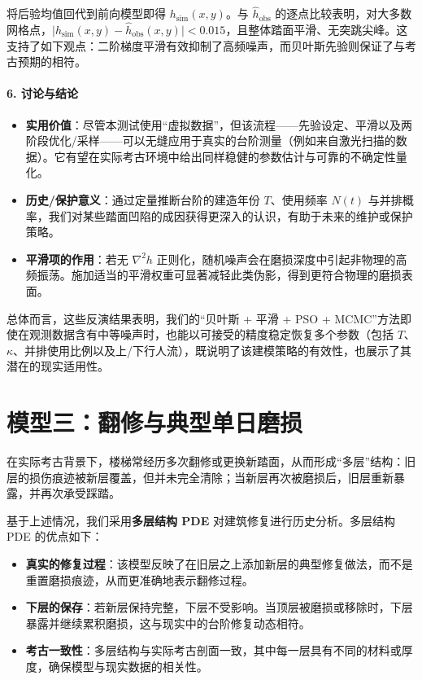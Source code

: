 \documentclass[11pt,a4paper,fontset=windows]{ctexart}
\begin{document}
将后验均值回代到前向模型即得 $h_{\text{sim}}(x,y)$。与 $\hat{h}_{\text{obs}}$ 的逐点比较表明，对大多数网格点，$\bigl|h_{\text{sim}}(x,y)-\hat{h}_{\text{obs}}(x,y)\bigr|<0.015$，且整体踏面平滑、无突跳尖峰。这支持了如下观点：二阶梯度平滑有效抑制了高频噪声，而贝叶斯先验则保证了与考古预期的相符。

\paragraph*{6. 讨论与结论}
\begin{itemize}
\item \textbf{实用价值}：尽管本测试使用“虚拟数据”，但该流程——先验设定、平滑以及两阶段优化/采样——可以无缝应用于真实的台阶测量（例如来自激光扫描的数据）。它有望在实际考古环境中给出同样稳健的参数估计与可靠的不确定性量化。
\end{itemize}

\begin{itemize}
\item \textbf{历史/保护意义}：通过定量推断台阶的建造年份 $T$、使用频率 $N(t)$ 与并排概率，我们对某些踏面凹陷的成因获得更深入的认识，有助于未来的维护或保护策略。

\item \textbf{平滑项的作用}：若无 $\nabla^2h$ 正则化，随机噪声会在磨损深度中引起非物理的高频振荡。施加适当的平滑权重可显著减轻此类伪影，得到更符合物理的磨损表面。
\end{itemize}

总体而言，这些反演结果表明，我们的“贝叶斯 + 平滑 + PSO + MCMC”方法即使在观测数据含有中等噪声时，也能以可接受的精度稳定恢复多个参数（包括 $T$、$\kappa$、并排使用比例以及上/下行人流），既说明了该建模策略的有效性，也展示了其潜在的现实适用性。

\section{模型三：翻修与典型单日磨损}

在实际考古背景下，楼梯常经历多次翻修或更换新踏面，从而形成“多层”结构：旧层的损伤痕迹被新层覆盖，但并未完全清除；当新层再次被磨损后，旧层重新暴露，并再次承受踩踏。

基于上述情况，我们采用\textbf{多层结构 PDE} 对建筑修复进行历史分析。多层结构 PDE 的优点如下：

\begin{itemize}
\item \textbf{真实的修复过程}：该模型反映了在旧层之上添加新层的典型修复做法，而不是重置磨损痕迹，从而更准确地表示翻修过程。
\item \textbf{下层的保存}：若新层保持完整，下层不受影响。当顶层被磨损或移除时，下层暴露并继续累积磨损，这与现实中的台阶修复动态相符。
\item \textbf{考古一致性}：多层结构与实际考古剖面一致，其中每一层具有不同的材料或厚度，确保模型与现实数据的相关性。
\end{itemize}
\end{document}
